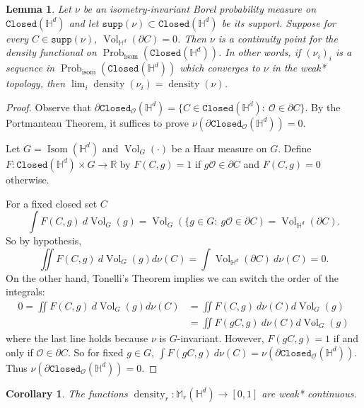 \documentclass[11pt]{amsart}
\newtheorem{lemma}[theorem]{Lemma}
\newtheorem{corollary}[theorem]{Corollary}
\theoremstyle{definition}
\theoremstyle{remark}
\renewcommand{\H}{\mathbb{H}}
\newcommand{\R}{\mathbb{R}}
\newcommand{\M}{\mathbb{M}}
\newcommand{\cO}{\mathcal{O}}
\newcommand{\Closed}{\mathtt{Closed}}
\newcommand{\isom}{\operatorname{isom}}
\newcommand{\Isom}{\operatorname{Isom}}
\newcommand{\density}{\operatorname{density}}
\newcommand{\Prob}{\operatorname{Prob}}
\newcommand{\vol}{\operatorname{Vol}}
\begin{document}
\begin{lemma}\label{L:continuity-general}
    Let $\nu$ be an isometry-invariant Borel probability measure on $\Closed(\H^d)$ and let $\mathtt{supp}(\nu) \subset \Closed(\H^d)$ be its support. Suppose for every $C \in \mathtt{supp}(\nu)$, $\vol_{\H^d}(\partial C)=0$. Then $\nu$ is a continuity point for the density functional on $\Prob_{\isom}(\Closed(\H^d))$. In other words, if $(\nu_i)_i$ is a sequence in $\Prob_{\isom}(\Closed(\H^d))$ which converges to $\nu$ in the weak* topology, then $\lim_i \density(\nu_i)=\density(\nu)$. 
\end{lemma}

\begin{proof}
    Observe that $\partial \Closed_\cO(\H^d)=\{C\in \Closed(\H^d):~\cO \in \partial C\}$. By the Portmanteau Theorem, it suffices to prove $\nu(\partial \Closed_\cO(\H^d))=0$. 

    Let $G=\Isom(\H^d)$ and $\vol_G(\cdot)$ be a Haar measure on $G$. Define $F:\Closed(\H^d) \times G \to \R$ by $F(C,g)=1$ if $g\cO \in \partial C$ and $F(C,g)=0$ otherwise. 

For a fixed closed set $C$
    $$\int F(C,g)~d\vol_G(g) = \vol_G(\{g\in G:~g\cO\in \partial C)= \vol_{\H^d}(\partial C).$$
So by hypothesis,
$$\iint F(C,g)~d\vol_G(g)d\nu(C)=\int \vol_{\H^d}(\partial C)~d\nu(C)=0.$$
On the other hand, Tonelli's Theorem implies we can switch the order of the integrals:
\begin{align*}
 0=   \iint F(C,g)~d\vol_G(g)d\nu(C)&=\iint F(C,g)~d\nu(C)d\vol_G(g) \\
    &=\iint F(gC,g)~d\nu(C)d\vol_G(g)
\end{align*}
where the last line holds because $\nu$ is $G$-invariant.  However, $F(gC,g)=1$ if and only if $\cO \in \partial C$. So for fixed $g\in G$, $\int F(gC,g)~d\nu(C) = \nu(\partial \Closed_\cO(\H^d))$. 
Thus $\nu(\partial \Closed_\cO(\H^d))=0$. 
\end{proof}

\begin{corollary}\label{cor:continuityofdensity1}
The functions $\density_r:\M_r(\H^d) \to [0,1]$ are weak* continuous.
\end{corollary}
\end{document}
